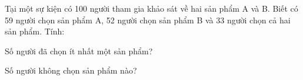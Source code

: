 \documentclass[a4paper,12pt]{article}
\begin{document}
\begin{ex}%
Tại một sự kiện có 100 người tham gia khảo sát về hai sản phẩm A và B. Biết có 59 người chọn sản phẩm A, 52 người chọn sản phẩm B và 33 người chọn cả hai sản phẩm. Tính: 
\begin{listEX}[1]
\item Số người đã chọn ít nhất một sản phẩm? 
\item Số người không chọn sản phẩm nào? 
\end{listEX}

\end{ex}
\end{document}
